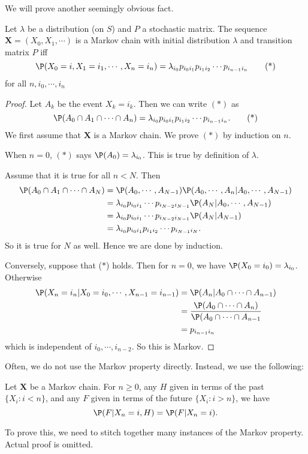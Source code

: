 \documentclass[a4paper]{article}
\begin{document}
We will prove another seemingly obvious fact.
\begin{thm}
  Let $\lambda$ be a distribution (on $S$) and $P$ a stochastic matrix. The sequence $\mathbf{X} = (X_0, X_1, \cdots)$ is a Markov chain with initial distribution $\lambda$ and transition matrix $P$ iff
  \[
    \P(X_0 = i, X_1 = i_1, \cdots, X_n = i_n) = \lambda_{i_0}p_{i_0 i_1}p_{i_1i_2}\cdots p_{i_{n - 1}i_n}\tag{*}
  \]
  for all $n, i_0, \cdots, i_n$
\end{thm}
\begin{proof}
  Let $A_k$ be the event $X_k = i_k$. Then we can write $(*)$ as
  \[
    \P(A_0\cap A_1\cap\cdots \cap A_n) = \lambda_{i_0}p_{i_0 i_1}p_{i_1i_2}\cdots p_{i_{n - 1}i_n}. \tag{*}
  \]
  We first assume that $\mathbf{X}$ is a Markov chain. We prove $(*)$ by induction on $n$.

  When $n = 0$, $(*)$ says $\P(A_0) = \lambda_{i_0}$. This is true by definition of $\lambda$.

  Assume that it is true for all $n < N$. Then
  \begin{align*}
    \P(A_0 \cap A_1 \cap \cdots \cap A_N) &= \P(A_0,\cdots, A_{N - 1})\P(A_0, \cdots, A_n | A_0, \cdots, A_{N - 1})\\
    &= \lambda_{i_0} p_{i_0 i_1}\cdots p_{i_{N - 2}i_{N - 1}} \P(A_{N} | A_0,\cdots, A_{N - 1})\\
    &= \lambda_{i_0} p_{i_0 i_1}\cdots p_{i_{N - 2}i_{N - 1}} \P(A_{N} | A_{N - 1})\\
    &= \lambda_{i_0}p_{i_0 i_1}p_{i_1i_2}\cdots p_{i_{N - 1}i_N}.
  \end{align*}
  So it is true for $N$ as well. Hence we are done by induction.

  Conversely, suppose that ($*$) holds. Then for $n = 0$, we have $\P(X_0 = i_0) = \lambda_{i_0}$. Otherwise
  \begin{align*}
    \P(X_n = i_n| X_0 = i_0, \cdots, X_{n - 1} = i_{n - 1}) &= \P(A_n | A_0 \cap \cdots\cap A_{n - 1})\\
    &= \frac{\P(A_0\cap \cdots \cap A_n)}{\P(A_0\cap \cdots \cap A_{n - 1}}\\
    &= p_{i_{n - 1}i_n}
  \end{align*}
  which is independent of $i_0, \cdots, i_{n - 2}$. So this is Markov.
\end{proof}

Often, we do not use the Markov property directly. Instead, we use the following:
\begin{thm}
  Let $\mathbf{X}$ be a Markov chain. For $n \geq 0$, any $H$ given in terms of the past $\{X_i: i < n\}$, and any $F$ given in terms of the future $\{X_i: i > n\}$, we have
  \[
    \P(F| X_n = i, H) = \P(F| X_n = i).
  \]
\end{thm}
To prove this, we need to stitch together many instances of the Markov property. Actual proof is omitted.
\end{document}
